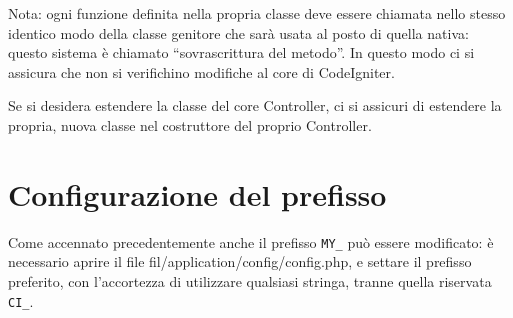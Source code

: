 Nota: ogni funzione definita nella propria classe deve essere chiamata nello stesso identico modo della classe genitore che sarà usata al posto di quella nativa: questo sistema è chiamato ``sovrascrittura del metodo''. In questo modo ci si assicura che non si verifichino modifiche al core di CodeIgniter.

Se si desidera estendere la classe del core Controller, ci si assicuri di estendere la propria, nuova classe nel costruttore del proprio Controller.


\section{Configurazione del prefisso}
Come accennato precedentemente anche il prefisso \verb|MY_| può essere modificato: è necessario aprire il file fil{/application/config/config.php}, e settare il prefisso preferito, con l'accortezza di utilizzare qualsiasi stringa, tranne quella riservata \verb|CI_|.

